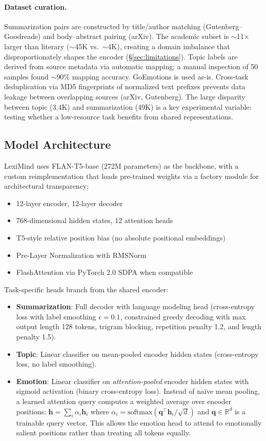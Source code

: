 \documentclass[11pt]{article}
\begin{document}
\paragraph{Dataset curation.} Summarization pairs are constructed by title/author matching (Gutenberg--Goodreads) and body--abstract pairing (arXiv). The academic subset is $\sim$11$\times$ larger than literary ($\sim$45K vs.\ $\sim$4K), creating a domain imbalance that disproportionately shapes the encoder (\S\ref{sec:limitations}). Topic labels are derived from source metadata via automatic mapping; a manual inspection of 50 samples found $\sim$90\% mapping accuracy. GoEmotions is used as-is. Cross-task deduplication via MD5 fingerprints of normalized text prefixes prevents data leakage between overlapping sources (arXiv, Gutenberg). The large disparity between topic (3.4K) and summarization (49K) is a key experimental variable: testing whether a low-resource task benefits from shared representations.

\subsection{Model Architecture}

LexiMind uses FLAN-T5-base (272M parameters) as the backbone, with a custom reimplementation that loads pre-trained weights via a factory module for architectural transparency:

\begin{itemize}
    \item 12-layer encoder, 12-layer decoder
    \item 768-dimensional hidden states, 12 attention heads
    \item T5-style relative position bias (no absolute positional embeddings)
    \item Pre-Layer Normalization with RMSNorm \citep{zhang2019root}
    \item FlashAttention via PyTorch 2.0 SDPA when compatible
\end{itemize}

Task-specific heads branch from the shared encoder:
\begin{itemize}
    \item \textbf{Summarization}: Full decoder with language modeling head (cross-entropy loss with label smoothing $\epsilon=0.1$, constrained greedy decoding with max output length 128 tokens, trigram blocking, repetition penalty 1.2, and length penalty 1.5).
    \item \textbf{Topic}: Linear classifier on mean-pooled encoder hidden states (cross-entropy loss, no label smoothing).
    \item \textbf{Emotion}: Linear classifier on \textit{attention-pooled} encoder hidden states with sigmoid activation (binary cross-entropy loss). Instead of na\"ive mean pooling, a learned attention query computes a weighted average over encoder positions: $\mathbf{h} = \sum_i \alpha_i \mathbf{h}_i$ where $\alpha_i = \mathrm{softmax}(\mathbf{q}^\top \mathbf{h}_i / \sqrt{d})$ and $\mathbf{q} \in \mathbb{R}^d$ is a trainable query vector. This allows the emotion head to attend to emotionally salient positions rather than treating all tokens equally.
\end{itemize}
\end{document}

